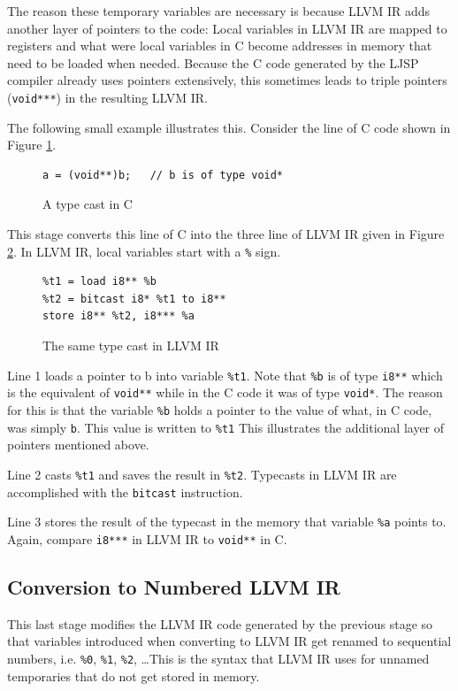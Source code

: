 \documentclass[11pt]{report}
\begin{document}
The reason these temporary variables are necessary is because LLVM IR adds another layer of pointers to the code: Local variables in LLVM IR are mapped to registers and what were local variables in C become addresses in memory that need to be loaded when needed. Because the C code generated by the LJSP compiler already uses pointers extensively, this sometimes leads to triple pointers (\texttt{void***}) in the resulting LLVM IR.

The following small example illustrates this. Consider the line of C code shown in Figure \ref{convllvmir1}.
\begin{figure}[ht]
\begin{lstlisting}
a = (void**)b;   // b is of type void*
\end{lstlisting}
\caption{A type cast in C}
\label{convllvmir1}
\end{figure}

This stage converts this line of C into the three line of LLVM IR given in Figure \ref{convllvmir2}. In LLVM IR, local variables start with a \texttt{\%} sign. 

\begin{figure}[ht]
\begin{lstlisting}
%t1 = load i8** %b
%t2 = bitcast i8* %t1 to i8**
store i8** %t2, i8*** %a
\end{lstlisting}
\caption{The same type cast in LLVM IR}
\label{convllvmir2}
\end{figure}

Line 1 loads a pointer to b into variable \texttt{\%t1}. Note that \texttt{\%b} is of type \texttt{i8**} which is the equivalent of \texttt{void**} while in the C code it was of type \texttt{void*}. The reason for this is that the variable \texttt{\%b} holds a pointer to the value of what, in C code, was simply \texttt{b}. This value is written to \texttt{\%t1} This illustrates the additional layer of pointers mentioned above.

Line 2 casts \texttt{\%t1} and saves the result in \texttt{\%t2}. Typecasts in LLVM IR are accomplished with the \texttt{bitcast} instruction.

Line 3 stores the result of the typecast in the memory that variable \texttt{\%a} points to. Again, compare \texttt{i8***} in LLVM IR to \texttt{void**} in C.

\subsection{Conversion to Numbered LLVM IR}
This last stage modifies the LLVM IR code generated by the previous stage so that variables introduced when converting to LLVM IR get renamed to sequential numbers, i.e. \texttt{\%0}, \texttt{\%1}, \texttt{\%2}, \dots This is the syntax that LLVM IR uses for unnamed temporaries that do not get stored in memory.
\end{document}
